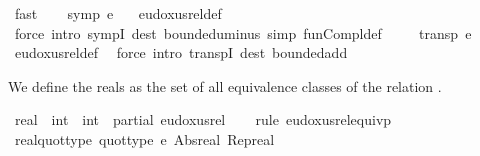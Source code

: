 \begin{isabellebody}
\ fast\isanewline
\ \ \isamarkupfalse%
\ {\isachardoublequoteopen}symp\ {\isacharparenleft}{\kern0pt}{\isasymsim}\isactrlsub e{\isacharparenright}{\kern0pt}{\isachardoublequoteclose}\ \ \isamarkupfalse%
\ eudoxus{\isacharunderscore}{\kern0pt}rel{\isacharunderscore}{\kern0pt}def\ \isamarkupfalse%
\ {\isacharparenleft}{\kern0pt}force\ intro{\isacharcolon}{\kern0pt}\ sympI\ dest{\isacharcolon}{\kern0pt}\ bounded{\isacharunderscore}{\kern0pt}uminus\ simp{\isacharcolon}{\kern0pt}\ fun{\isacharunderscore}{\kern0pt}Compl{\isacharunderscore}{\kern0pt}def{\isacharparenright}{\kern0pt}\ \isanewline
\ \ \isamarkupfalse%
\ {\isachardoublequoteopen}transp\ {\isacharparenleft}{\kern0pt}{\isasymsim}\isactrlsub e{\isacharparenright}{\kern0pt}{\isachardoublequoteclose}\ \ \isamarkupfalse%
\ eudoxus{\isacharunderscore}{\kern0pt}rel{\isacharunderscore}{\kern0pt}def\ \isamarkupfalse%
\ {\isacharparenleft}{\kern0pt}force\ intro{\isacharbang}{\kern0pt}{\isacharcolon}{\kern0pt}\ transpI\ dest{\isacharcolon}{\kern0pt}\ bounded{\isacharunderscore}{\kern0pt}add{\isacharparenright}{\kern0pt}\isanewline
{}\isamarkupfalse%
%
\endisatagproof
{\isafoldproof}%
%
\isadelimproof
%
\endisadelimproof
%
\begin{isamarkuptext}%
We define the reals as the set of all equivalence classes of the relation .%
\end{isamarkuptext}\isamarkuptrue%
\isamarkupfalse%
\ real\ {\isacharequal}{\kern0pt}\ {\isachardoublequoteopen}{\isacharparenleft}{\kern0pt}int\ {\isasymRightarrow}\ int{\isacharparenright}{\kern0pt}{\isachardoublequoteclose}\ {\isacharslash}{\kern0pt}\ partial{\isacharcolon}{\kern0pt}\ eudoxus{\isacharunderscore}{\kern0pt}rel\isanewline
%
\isadelimproof
\ \ %
\endisadelimproof
%
\isatagproof
{}\isamarkupfalse%
\ {\isacharparenleft}{\kern0pt}rule\ eudoxus{\isacharunderscore}{\kern0pt}rel{\isacharunderscore}{\kern0pt}equivp{\isacharparenright}{\kern0pt}%
\endisatagproof
{\isafoldproof}%
%
\isadelimproof
\isanewline
%
\endisadelimproof
\isanewline
{}\isamarkupfalse%
\ real{\isacharunderscore}{\kern0pt}quot{\isacharunderscore}{\kern0pt}type{\isacharcolon}{\kern0pt}\ {\isachardoublequoteopen}quot{\isacharunderscore}{\kern0pt}type\ {\isacharparenleft}{\kern0pt}{\isasymsim}\isactrlsub e{\isacharparenright}{\kern0pt}\ Abs{\isacharunderscore}{\kern0pt}real\ Rep{\isacharunderscore}{\kern0pt}real{\isachardoublequoteclose}\isanewline

\end{isabellebody}
